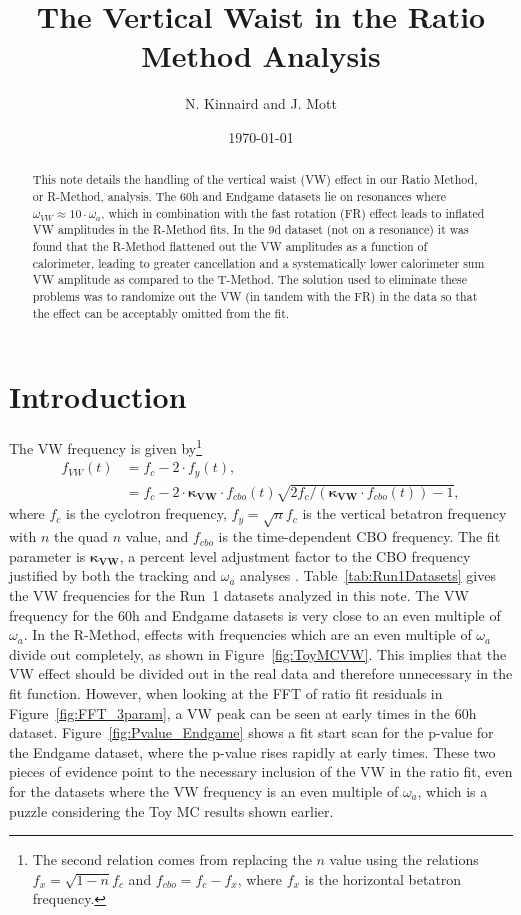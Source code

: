 \documentclass[12pt,letterpaper]{article}
\title{The Vertical Waist in the Ratio Method Analysis}
\author{N. Kinnaird and J. Mott}
\date{\today}
\newcommand{\figref}[1]{Figure~\ref{#1}}
\def\wa{$\omega_{a}$\xspace}
\begin{document}
\maketitle

\begin{abstract}
This note details the handling of the vertical waist (VW) effect in our Ratio Method, or R-Method, analysis. The 60h and Endgame datasets lie on resonances where $\omega_{VW} \approx 10 \cdot \omega_{a}$, which in combination with the fast rotation (FR) effect leads to inflated VW amplitudes in the R-Method fits. In the 9d dataset (not on a resonance) it was found that the R-Method flattened out the VW amplitudes as a function of calorimeter, leading to greater cancellation and a systematically lower calorimeter sum VW amplitude as compared to the T-Method. The solution used to eliminate these problems was to randomize out the VW (in tandem with the FR) in the data so that the effect can be acceptably omitted from the fit.
\end{abstract}


\section{Introduction}

The VW frequency is given by\footnote{The second relation comes from replacing the $n$ value using the relations $f_{x} = \sqrt{1-n}f_{c}$ and $f_{cbo} = f_{c}-f_{x}$, where $f_{x}$ is the horizontal betatron frequency.}
    \begin{align} \label{eq:VWfreqKappa}
        f_{VW}(t) &= f_{c} - 2 \cdot f_{y}(t), \\
               &= f_{c} - 2 \cdot \boldsymbol{\kappa_{VW}} \cdot f_{cbo}(t)\sqrt{2f_{c}/(\boldsymbol{\kappa_{VW}} \cdot f_{cbo}(t))-1},
    \end{align}
where $f_{c}$ is the cyclotron frequency, $f_{y} = \sqrt{n}f_{c}$ is the vertical betatron frequency with $n$ the quad $n$ value, and $f_{cbo}$ is the time-dependent CBO frequency. The fit parameter is $\boldsymbol{\kappa_{VW}}$, a percent level adjustment factor to the CBO frequency justified by both the tracking and \wa analyses \cite{cbofrequency}. Table~\ref{tab:Run1Datasets} gives the VW frequencies for the Run~1 datasets analyzed in this note. The VW frequency for the 60h and Endgame datasets is very close to an even multiple of \wa. In the R-Method, effects with frequencies which are an even multiple of \wa divide out completely, as shown in \figref{fig:ToyMCVW}. This implies that the VW effect should be divided out in the real data and therefore unnecessary in the fit function. However, when looking at the FFT of ratio fit residuals in \figref{fig:FFT_3param}, a VW peak can be seen at early times in the 60h dataset. \figref{fig:Pvalue_Endgame} shows a fit start scan for the p-value for the Endgame dataset, where the p-value rises rapidly at early times. These two pieces of evidence point to the necessary inclusion of the VW in the ratio fit, even for the datasets where the VW frequency is an even multiple of \wa, which is a puzzle considering the Toy MC results shown earlier.
\end{document}

